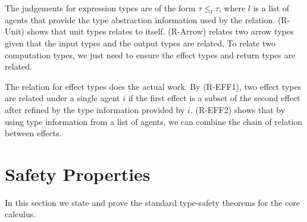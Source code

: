 The judgements for expression types are of the form $\tau \leq_l \tau$, where $l$ is a list of agents that provide the type abstraction information used by the relation. (R-Unit) shows that unit types relates to itself. (R-Arrow) relates two arrow types given that the input types and the output types are related,  To relate two computation types, we just need to ensure the effect types and return types are related. 

The relation for effect types does the actual work. By (R-EFF1), two effect types are related under a single agent $i$ if the first effect is a subset of the second effect after refined by the type information provided by $i$. (R-EFF2) shows that by using type information from a list of agents, we can combine the chain of relation between effects.

\section{Safety Properties}
In this section we state and prove the standard type-safety theorems for the core calculus.
